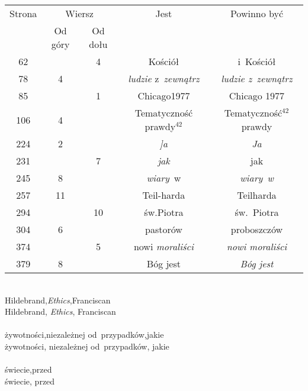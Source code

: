 \documentclass[a4paper,11pt]{article}
\numberwithin{equation}{section}
\begin{document}
\begin{center}

  \begin{tabular}{|c|c|c|c|c|}
    \hline
    Strona & \multicolumn{2}{c|}{Wiersz} & Jest
                              & Powinno być \\ \cline{2-3}
    & Od góry & Od dołu & & \\
    \hline
    \hphantom{0}62 & & \hphantom{0}4 & Kościół & i~Kościół \\
    \hphantom{0}78 & \hphantom{0}4 & & \textit{ludzie} z~\textit{zewnątrz}
           & \textit{ludzie z~zewnątrz} \\
    \hphantom{0}85 & & \hphantom{0}1 & Chicago1977 & Chicago 1977 \\
    106 &  4 & & Tematyczność prawdy$^{ 42 }$
           & Tematyczność$^{ 42 }$ prawdy \\
    224 &  2 & & \textit{]a} & \textit{Ja} \\
    231 & &  7 & \textit{jak} & jak \\
    245 &  8 & & \textit{wiary}~w & \textit{wiary~w} \\
    257 & 11 & & Teil-harda & Teilharda \\
    294 & & 10 & św.Piotra & św.~Piotra \\
    304 &  6 & & pastorów & proboszczów \\
    374 & &  5 & nowi \textit{moraliści} & \textit{nowi moraliści} \\
    379 &  8 & & Bóg jest & \textit{Bóg jest} \\
    \hline
  \end{tabular}

\end{center}

\VerSpaceTwo


\noindent
{} \\
\Jest Hildebrand,\textit{Ethics},Franciscan \\
\PowinnoByc Hildebrand, \textit{Ethics}, Franciscan \\
 \\
\Jest żywotności,niezależnej od~przypadków,jakie \\
\PowinnoByc żywotności, niezależnej od~przypadków, jakie \\
 \\
\Jest świecie,przed \\
\PowinnoByc świecie, przed \\
\end{document}
